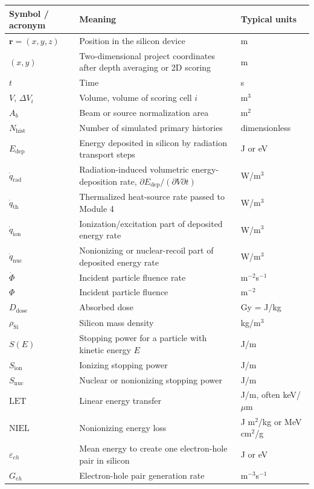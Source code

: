 \documentclass[11pt]{article}
\newcommand{\Edep}{E_{\mathrm{dep}}}
\newcommand{\qrad}{\dot{q}_{\mathrm{rad}}}
\newcommand{\qth}{\dot{q}_{\mathrm{th}}}
\newcommand{\qion}{\dot{q}_{\mathrm{ion}}}
\newcommand{\qnuc}{\dot{q}_{\mathrm{nuc}}}
\newcommand{\PhiFlu}{\Phi}
\newcommand{\Phidot}{\dot{\Phi}}
\newcommand{\LET}{\mathrm{LET}}
\newcommand{\NIEL}{\mathrm{NIEL}}
\newcommand{\rpos}{\mathbf{r}}
\newcommand{\epspair}{\varepsilon_{eh}}
\newcommand{\rhoSi}{\rho_{\mathrm{Si}}}
\newcommand{\Geh}{G_{eh}}
\begin{document}
\renewcommand{\arraystretch}{1.22}
\begin{longtable}{p{} p{} p{}}
\toprule
\textbf{Symbol / acronym} & \textbf{Meaning} & \textbf{Typical units} \\
\midrule
\endhead
$\rpos=(x,y,z)$ & Position in the silicon device & m \\
$(x,y)$ & Two-dimensional project coordinates after depth averaging or 2D scoring & m \\
$t$ & Time & s \\
$V$, $\Delta V_i$ & Volume, volume of scoring cell $i$ & m$^3$ \\
$A_b$ & Beam or source normalization area & m$^2$ \\
$N_{\mathrm{hist}}$ & Number of simulated primary histories & dimensionless \\
$\Edep$ & Energy deposited in silicon by radiation transport steps & J or eV \\
$\qrad$ & Radiation-induced volumetric energy-deposition rate, $\partial E_{\mathrm{dep}}/(\partial V\partial t)$ & W/m$^3$ \\
$\qth$ & Thermalized heat-source rate passed to Module 4 & W/m$^3$ \\
$\qion$ & Ionization/excitation part of deposited energy rate & W/m$^3$ \\
$\qnuc$ & Nonionizing or nuclear-recoil part of deposited energy rate & W/m$^3$ \\
$\Phidot$ & Incident particle fluence rate & m$^{-2}$s$^{-1}$ \\
$\PhiFlu$ & Incident particle fluence & m$^{-2}$ \\
$D_{\mathrm{dose}}$ & Absorbed dose & Gy = J/kg \\
$\rhoSi$ & Silicon mass density & kg/m$^3$ \\
$S(E)$ & Stopping power for a particle with kinetic energy $E$ & J/m \\
$S_{\mathrm{ion}}$ & Ionizing stopping power & J/m \\
$S_{\mathrm{nuc}}$ & Nuclear or nonionizing stopping power & J/m \\
$\LET$ & Linear energy transfer & J/m, often keV/$\mu$m \\
$\NIEL$ & Nonionizing energy loss & J m$^2$/kg or MeV cm$^2$/g \\
$\epspair$ & Mean energy to create one electron-hole pair in silicon & J or eV \\
$\Geh$ & Electron-hole pair generation rate & m$^{-3}$s$^{-1}$ \\

\end{longtable}
\end{document}
